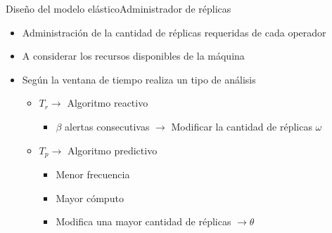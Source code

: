 \begin{frame}{Diseño del modelo elástico}{Administrador de réplicas}
\begin{itemize}
\item Administración de la cantidad de réplicas requeridas de cada operador
\item A considerar los recursos disponibles de la máquina
\item Según la ventana de tiempo realiza un tipo de análisis
\begin{itemize}
	\item $T_r \rightarrow $ Algoritmo reactivo
	\begin{itemize}
		\item $\beta$ alertas consecutivas $\rightarrow$ Modificar la cantidad de réplicas $\omega$
	\end{itemize}
	\item $T_p \rightarrow $ Algoritmo predictivo
	\begin{itemize}
		\item Menor frecuencia
		\item Mayor cómputo
		\item Modifica una mayor cantidad de réplicas $\rightarrow \theta$
	\end{itemize}
\end{itemize}
\end{itemize}
\end{frame}